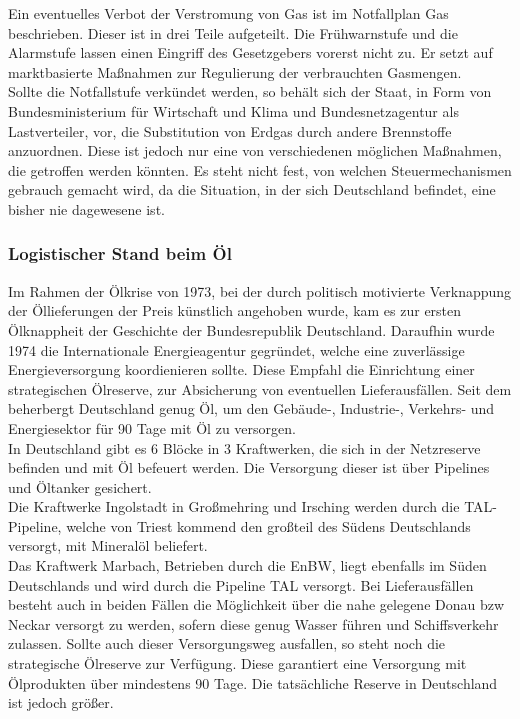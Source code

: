 	Ein eventuelles Verbot der Verstromung von Gas ist im Notfallplan Gas beschrieben. Dieser ist in drei Teile aufgeteilt. Die Frühwarnstufe und die Alarmstufe lassen einen Eingriff des Gesetzgebers vorerst nicht zu. Er setzt auf marktbasierte Maßnahmen zur Regulierung der verbrauchten Gasmengen. \\
	
	Sollte die Notfallstufe verkündet werden, so behält sich der Staat, in Form von Bundesministerium für Wirtschaft und Klima und Bundesnetzagentur als Lastverteiler, vor, die Substitution von Erdgas durch andere Brennstoffe anzuordnen. Diese ist jedoch nur eine von verschiedenen möglichen Maßnahmen, die getroffen werden könnten. Es steht nicht fest, von welchen Steuermechanismen gebrauch gemacht wird, da die Situation, in der sich Deutschland befindet, eine bisher nie dagewesene ist. \cite{Notfallplan_Gas}
	
	\subsubsection{Logistischer Stand beim Öl}
	Im Rahmen der Ölkrise von 1973, bei der durch politisch motivierte Verknappung der Öllieferungen der Preis künstlich angehoben wurde, kam es zur ersten Ölknappheit der Geschichte der Bundesrepublik Deutschland. Daraufhin wurde 1974 die Internationale Energieagentur gegründet, welche eine zuverlässige Energieversorgung koordienieren sollte. Diese Empfahl die Einrichtung einer strategischen Ölreserve, zur Absicherung von eventuellen Lieferausfällen. Seit dem beherbergt Deutschland genug Öl, um den Gebäude-, Industrie-, Verkehrs- und Energiesektor für 90 Tage mit Öl zu versorgen.\cite{strat_Ölreserve_Geschichte}\\
	
	In Deutschland gibt es 6 Blöcke in 3 Kraftwerken, die sich in der Netzreserve befinden und mit Öl befeuert werden.\cite{Excel_Kraftwerksliste} Die Versorgung dieser ist über Pipelines und Öltanker gesichert.\\
	Die Kraftwerke Ingolstadt in Großmehring und Irsching werden durch die TAL-Pipeline, welche von Triest kommend den großteil des Südens Deutschlands versorgt, mit Mineralöl beliefert.\\
	Das Kraftwerk Marbach, Betrieben durch die EnBW, liegt ebenfalls im Süden Deutschlands und wird durch die Pipeline TAL versorgt. Bei Lieferausfällen besteht auch in beiden Fällen die Möglichkeit über die nahe gelegene Donau bzw Neckar versorgt zu werden, sofern diese genug Wasser führen und Schiffsverkehr zulassen. Sollte auch dieser Versorgungsweg ausfallen, so steht noch die strategische Ölreserve zur Verfügung. Diese garantiert eine Versorgung mit Ölprodukten über mindestens 90 Tage. Die tatsächliche Reserve in Deutschland ist jedoch größer.\\
	
